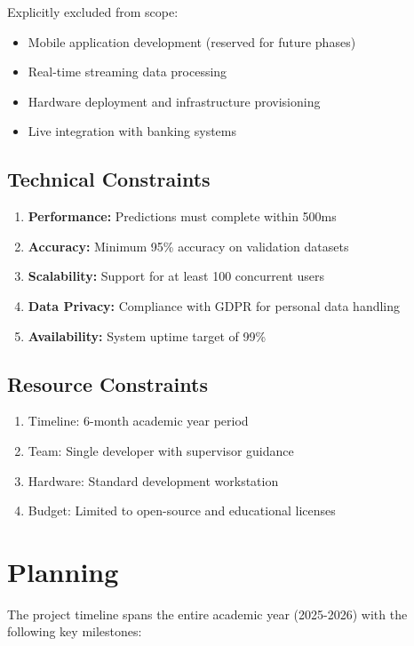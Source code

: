 \documentclass[12pt,a4paper,twoside]{report}
\begin{document}
Explicitly excluded from scope:

\begin{itemize}
    \item Mobile application development (reserved for future phases)
    \item Real-time streaming data processing
    \item Hardware deployment and infrastructure provisioning
    \item Live integration with banking systems
\end{itemize}

\subsection{Technical Constraints}

\begin{enumerate}
    \item \textbf{Performance:} Predictions must complete within 500ms
    \item \textbf{Accuracy:} Minimum 95\% accuracy on validation datasets
    \item \textbf{Scalability:} Support for at least 100 concurrent users
    \item \textbf{Data Privacy:} Compliance with GDPR for personal data handling
    \item \textbf{Availability:} System uptime target of 99\%
\end{enumerate}

\subsection{Resource Constraints}

\begin{enumerate}
    \item Timeline: 6-month academic year period
    \item Team: Single developer with supervisor guidance
    \item Hardware: Standard development workstation
    \item Budget: Limited to open-source and educational licenses
\end{enumerate}

\section{Planning}

The project timeline spans the entire academic year (2025-2026) with the following key milestones:
\end{document}
